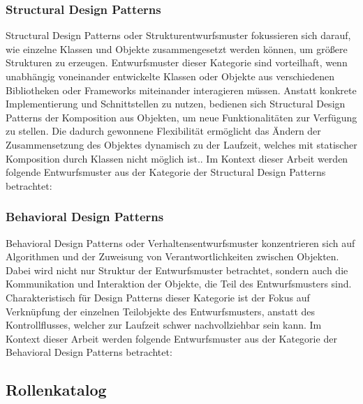 \subsubsection{Structural Design Patterns}

Structural Design Patterns oder Strukturentwurfsmuster fokussieren sich darauf, wie einzelne Klassen und Objekte zusammengesetzt werden können, um größere Strukturen zu erzeugen\cite[S. 137]{gamma1994design}.
Entwurfsmuster dieser Kategorie sind vorteilhaft, wenn unabhängig voneinander entwickelte Klassen oder Objekte aus verschiedenen Bibliotheken oder Frameworks miteinander interagieren müssen.
Anstatt konkrete Implementierung und Schnittstellen zu nutzen, bedienen sich Structural Design Patterns der Komposition aus Objekten, um neue Funktionalitäten zur Verfügung zu stellen\cite[S. 137]{gamma1994design}.
Die dadurch gewonnene Flexibilität ermöglicht das Ändern der Zusammensetzung des Objektes dynamisch zu der Laufzeit, welches mit statischer Komposition durch Klassen nicht möglich ist.\cite[S. 137]{gamma1994design}.
Im Kontext dieser Arbeit werden folgende Entwurfsmuster aus der Kategorie der Structural Design Patterns betrachtet:



\subsubsection{Behavioral Design Patterns}

Behavioral Design Patterns oder Verhaltensentwurfsmuster konzentrieren sich auf Algorithmen und der Zuweisung von Verantwortlichkeiten zwischen Objekten\cite[S. 221]{gamma1994design}.
Dabei wird nicht nur Struktur der Entwurfsmuster betrachtet, sondern auch die Kommunikation und Interaktion der Objekte, die Teil des Entwurfsmusters sind. Charakteristisch für Design Patterns dieser Kategorie ist der Fokus auf Verknüpfung der einzelnen Teilobjekte des Entwurfsmusters,
anstatt des Kontrollflusses, welcher zur Laufzeit schwer nachvollziehbar sein kann\cite[S. 221]{gamma1994design}.
Im Kontext dieser Arbeit werden folgende Entwurfsmuster aus der Kategorie der Behavioral Design Patterns betrachtet:


\subsection{Rollenkatalog}